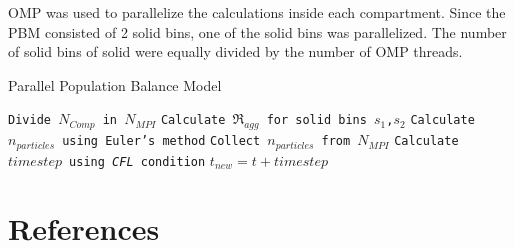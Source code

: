 \documentclass[preprint,11pt,authoryear]{elsarticle}
\begin{document}
OMP was used to parallelize the calculations inside each compartment. Since 
the PBM consisted of 2 solid bins, one of the solid bins was parallelized. 
The number of solid bins of solid were equally divided by the number of OMP threads. 

     \begin{algorithm}[H]
     \scriptsize
     \caption{Parallel Population Balance Model}
     \label{alg:parallelPBM}
     \begin{algorithmic}[1]
     \State \texttt{Divide $N_{Comp}$ in $N_{MPI}$}
     \State \texttt{Calculate $\Re_{agg}$ for solid bins $s_1$,$s_2$}
     \EndFor 
     \State \texttt{Calculate $n_{particles}$ using Euler's method}
     \EndFor
     \State \texttt{Collect $n_{particles}$ from $N_{MPI}$}
     \State \texttt{Calculate $timestep$ using \textit{CFL} condition}
     \State \texttt{$t_{new} = t + timestep$ }
     \EndWhile
     \EndProcedure
     \end{algorithmic}
 \label{alg:parpbm}
 \end{algorithm}     

 

\section*{References} 


\end{document}
